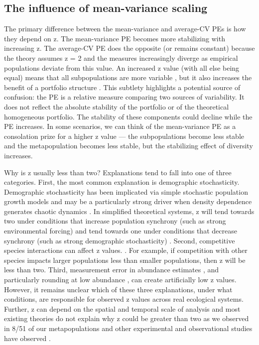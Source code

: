\subsection{The influence of mean-variance scaling}

The primary difference between the mean-variance and average-CV PEs is how they
depend on z. The mean-variance PE becomes more stabilizing with increasing z.
The average-CV PE does the opposite (or remains constant) because the theory
assumes z = 2 and the measures increasingly diverge as empirical populations
deviate from this value. An increased z value (with all else being equal) means
that all subpopulations are more variable \citep{mellin2010}, but it also
increases the benefit of a portfolio structure \citep{tilman1998,
tilman1999, cottingham2001}. This subtlety highlights a potential
source of confusion: the PE is a relative measure comparing two sources of
variability. It does not reflect the absolute stability of the portfolio or of
the theoretical homogeneous portfolio. The stability of these components could
decline while the PE increases. In some scenarios, we can think of the
mean-variance PE as a consolation prize for a higher z value --- the
subpopulations become less stable and the metapopulation becomes less stable,
but the stabilizing effect of diversity increases.

Why is z usually less than two?
Explanations tend to fall into one of three categories. First, the most common
explanation is demographic stochasticity. Demographic stochasticity has been
implicated via simple stochastic population growth models
\citep[e.g.][]{anderson1982, ballantyne2005} and may be a
particularly strong driver when density dependence generates chaotic dynamics
\citep{perry1994}. In simplified theoretical systems, z will tend towards
two under conditions that increase population synchrony (such as strong
environmental forcing) and tend towards one under conditions that decrease
synchrony (such as strong demographic stochasticity) \citep{loreau2010}.
Second, competitive species interactions can affect z values.
\citep{kilpatrick2003}. For example, if competition with other species
impacts larger populations less than smaller populations, then z
will be less than two. Third, measurement error in abundance estimates
\citep{perry1981}, and particularly rounding at low abundance
\citep{taylor1982}, can create artificially low z values. However, it
remains unclear which of these three explanations, under what conditions, are
responsible for observed z values across real ecological systems. Further, z can
depend on the spatial and temporal scale of analysis \citep{leps1993} and
most existing theories do not explain why z could be greater than two as
we observed in 8/51 of our metapopulations and other experimental and
observational studies have observed \citep[e.g.][]{valone2003}.

